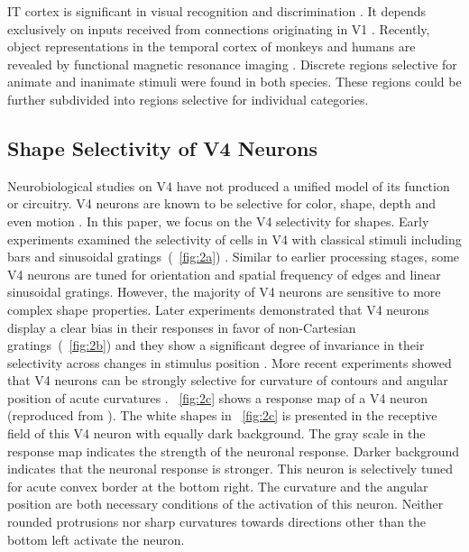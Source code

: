 \documentclass[10pt]{article}
\begin{document}
IT cortex is significant in visual recognition and
discrimination \cite{desimone1980,bell2009,ungerleider2011,bruce1981}.
It depends exclusively on inputs received from
connections originating in V1 \cite{desimone1980}.
Recently, object representations in the temporal cortex of monkeys and humans are revealed 
by functional magnetic resonance imaging \cite{bell2009}.
Discrete regions selective for animate and inanimate stimuli were found in both species.
These regions could be further subdivided into regions selective for individual categories.

\subsection{Shape Selectivity of V4 Neurons}

Neurobiological studies on V4 have not produced a unified model of its function or circuitry.
V4 neurons are known to be selective for color, shape, depth and even motion \cite{roe2012}.
In this paper, we focus on the V4 selectivity for shapes. 
Early experiments examined the selectivity of cells in V4 
with classical stimuli including bars and sinusoidal gratings~(\figurename~\ref{fig:2a}) \cite{desimone1987}.
Similar to earlier processing stages, some V4 neurons are tuned for orientation 
and spatial frequency of edges and linear sinusoidal gratings.
However, the majority of V4 neurons are sensitive to more complex shape properties. 
Later experiments demonstrated that V4 neurons display a clear bias in their responses 
in favor of non-Cartesian gratings~(\figurename~\ref{fig:2b}) and they show a significant degree of invariance 
in their selectivity across changes in stimulus position \cite{gallant1996}.
More recent experiments showed that V4 neurons can be strongly selective for curvature
of contours and angular position of acute curvatures \cite{pasupathy1999,pasupathy2001}. 
\figurename~\ref{fig:2c} shows a response map of a V4 neuron
(reproduced from \cite{pasupathy2001}).
The white shapes in \figurename~\ref{fig:2c} is presented in the receptive field of this V4 neuron
with equally dark background. 
The gray scale in the response map indicates the strength of the neuronal response.
Darker background indicates that the neuronal response is stronger.
This neuron is selectively tuned for acute convex border at the bottom right.
The curvature and the angular position are both necessary conditions of the activation of this neuron.
Neither rounded protrusions nor sharp curvatures towards directions other than the bottom left
activate the neuron.
\end{document}
